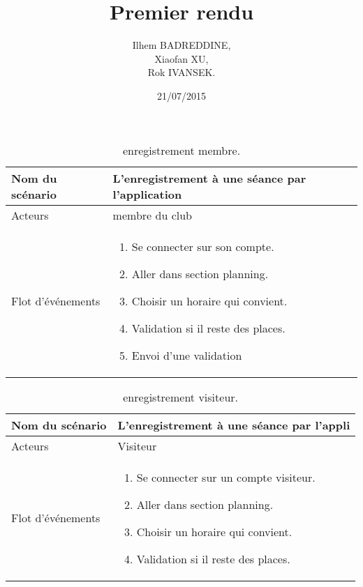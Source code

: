 \documentclass{report}
\title{Premier rendu }
\author{Ilhem BADREDDINE, \\ Xiaofan XU, \\ Rok IVANSEK.}
\date{21/07/2015}
\begin{document}
\begin{table}[htbp]
\begin{center}
\begin{tabular}{|L{4cm}||L{10cm}|}
\hline Nom du scénario & L'enregistrement à une séance par l'application    \\
\hline  Acteurs &  membre du club \\
\hline  Flot d'événements &  \begin{enumerate}
\item Se connecter sur son compte.
\item Aller dans section planning.
\item Choisir un horaire qui convient.
\item Validation si il reste des places.
\item Envoi d'une validation
\end{enumerate} \\
\hline
\end{tabular}
\caption{enregistrement membre.\label{engmembre}}
\end{center}
\end{table}

\begin{table}[htbp]
\begin{center}
\begin{tabular}{|L{4cm}||L{10cm}|}
\hline Nom du scénario & L'enregistrement à une séance par l'appli    \\
\hline  Acteurs &  Visiteur \\
\hline  Flot d'événements &  \begin{enumerate}
\item Se connecter sur un compte visiteur.
\item Aller dans section planning.
\item Choisir un horaire qui convient.
\item Validation si il reste des places.
\end{enumerate}\\
\hline
\end{tabular}
\caption{enregistrement visiteur.\label{engvisit}}
\end{center}
\end{table}
\end{document}
